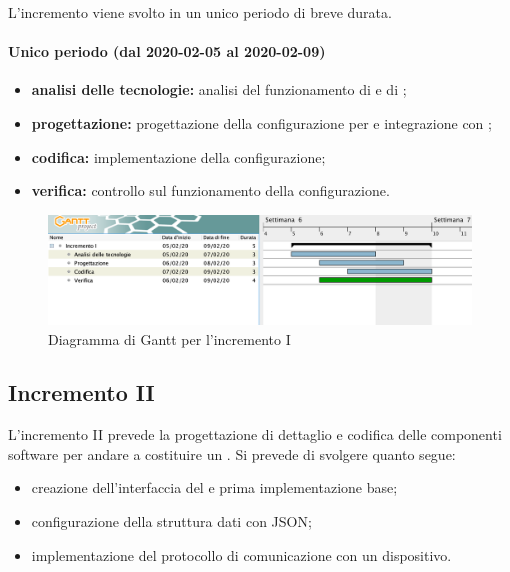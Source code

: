 				L'incremento viene svolto in un unico periodo di breve durata.
				
				\paragraph{Unico periodo (dal 2020-02-05 al 2020-02-09)}
				
					\begin{itemize}
						\item \textbf{analisi delle tecnologie:} analisi del funzionamento di  e di ;
						\item \textbf{progettazione:} progettazione della configurazione per  e integrazione con ;
						\item \textbf{codifica:} implementazione della configurazione;
						\item \textbf{verifica:} controllo sul funzionamento della configurazione.
					\end{itemize} 			

		\begin{landscape}

          \begin{figure}[H]
            \centering
            \includegraphics[width=\linewidth]{images/gantt/incrementoI} %
            \caption{Diagramma di Gantt per l'incremento I}
          \end{figure}		

		\end{landscape}


		\subsection{Incremento II}
			
			L'incremento II prevede la progettazione di dettaglio e codifica delle componenti software per andare a costituire un . Si prevede di svolgere quanto segue:
			\begin{itemize}
				\item creazione dell'interfaccia del  e prima implementazione base;
				\item configurazione della struttura dati con JSON;
				\item implementazione del protocollo di comunicazione con un dispositivo.
			\end{itemize}
			
